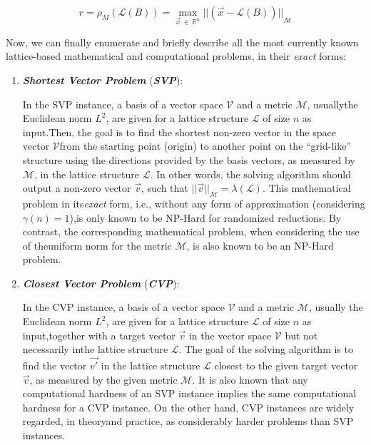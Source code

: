\documentclass[runningheads]{llncs}
\numberwithin{equation}{section}
\begin{document}
    \begin{equation}
        r = {\rho}_{M}(\mathcal{L}(B)) = \max_{\Vec{x}\ \in\ {\mathbb{R}}^{n}} {|| (\Vec{x} - \mathcal{L}(B) ) ||}_{\mathcal{M}}
        \label{equ:covering-radius-in-lattice}
    \end{equation}
    \vspace{1ex}

    \noindent Now, we can finally enumerate and briefly describe all the most currently known lattice-based mathematical and computational problems, in their \textit{exact} forms:

    \begin{enumerate}
        \item \textbf{\textit{Shortest Vector Problem}} (\textbf{\textit{SVP}}):
        \vspace{0.6ex}
        
        In the SVP instance, a basis of a vector space $\mathcal{V}$ and a metric $\mathcal{M}$, usually\break the Euclidean norm ${L}^{2}$, are given for a lattice structure $\mathcal{L}$ of size $n$ as input.\break Then, the goal is to find the shortest non-zero vector in the space vector $\mathcal{V}$\break from the starting point (origin) to another point on the ``grid-like'' structure using the directions provided by the basis vectors, as measured by $\mathcal{M}$, in the lattice structure $\mathcal{L}$. In other words, the solving algorithm should output a non-zero vector $\Vec{v}$, such that ${||\Vec{v}||}_{\mathcal{M}} = \lambda(\mathcal{L})$. This mathematical problem in its\break \textit{exact} form, i.e., without any form of approximation (considering $\gamma(n) = 1$),\break is only known to be NP-Hard for randomized reductions. By contrast, the corresponding mathematical problem, when considering the use of the\break uniform norm for the metric $\mathcal{M}$, is also known to be an NP-Hard problem.
        \vspace{2ex}

        \item \textbf{\textit{Closest Vector Problem}} (\textbf{\textit{CVP}}):
        \vspace{0.6ex}

        In the CVP instance, a basis of a vector space $\mathcal{V}$ and a metric $\mathcal{M}$, usually the Euclidean norm ${L}^{2}$, are given for a lattice structure $\mathcal{L}$ of size $n$ as input,\break together with a target vector $\Vec{v}$ in the vector space $\mathcal{V}$ but not necessarily in\break the lattice structure $\mathcal{L}$. The goal of the solving algorithm is to find the vector $\Vec{v'}$ in the lattice structure $\mathcal{L}$ closest to the given target vector $\Vec{v}$, as measured by the given metric $\mathcal{M}$. It is also known that any computational hardness of an SVP instance implies the same computational hardness for a CVP instance. On the other hand, CVP instances are widely regarded, in theory\break and practice, as considerably harder problems than SVP instances.
        \vspace{2ex}


\end{enumerate}
\end{document}
